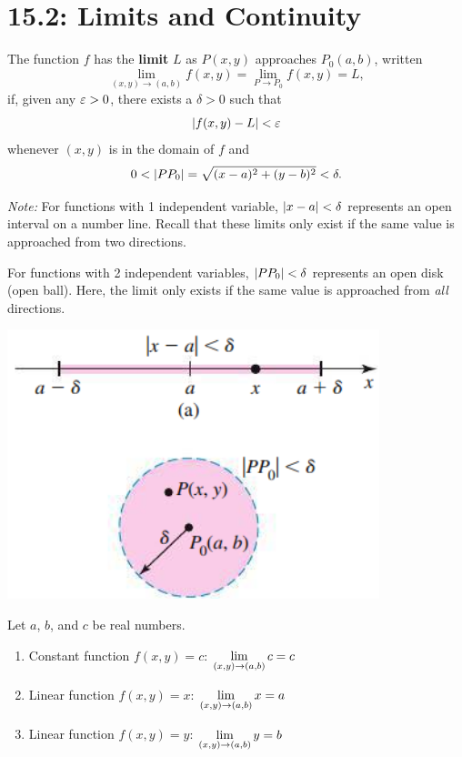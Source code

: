 \documentclass[../mathNotesPreamble]{subfiles}
\begin{document}
\section{15.2: Limits and Continuity}

  \begin{defn*}
    The function $f$ has the \textbf{limit} $L$ as $P(x,y)$ approaches $P_0(a,b)$, written
      \[\lim_{(x,y)\to (a,b)} f(x,y)=\lim_{P\to P_0}f(x,y)=L,\]
    if, given any $\varepsilon>0$, there exists a $\delta>0$ such that
      \[{\left\vert f(x,y)-L\right\vert}<\varepsilon\]
    whenever $(x,y)$ is in the domain of $f$ and 
      \[0< {\left\vert PP_0\right\vert}=\sqrt{(x-a)^2+(y-b)^2}<\delta.\]
  \end{defn*}
  \textit{Note:} For functions with 1 independent variable, ${\left\vert x-a\right\vert}<\delta$ represents an open interval on a number line. Recall that these limits only exist if the same value is approached from two directions.
  
  For functions with 2 independent variables, ${\left\vert PP_0\right\vert}<\delta$ represents an open disk (open ball). Here, the limit only exists if the same value is approached from \textit{all} directions.

  \begin{center}
    \includegraphics[width=0.5\linewidth]{../images/briggs_15_02/fig15_19}
  \end{center}
  \pagebreak

  \begin{thmBox*}
    Let $a$, $b$, and $c$ be real numbers.
    \begin{enumerate}
      \item Constant function $f(x,y)=c$: \tab $\displaystyle\lim_{(x,y)\to (a,b)} c=c$
      \item Linear function $f(x,y)=x$: \tab $\displaystyle\lim_{(x,y)\to (a,b)} x=a$
      \item Linear function $f(x,y)=y$: \tab $\displaystyle\lim_{(x,y)\to (a,b)} y=b$
    \end{enumerate}
  \end{thmBox*}
\end{document}
